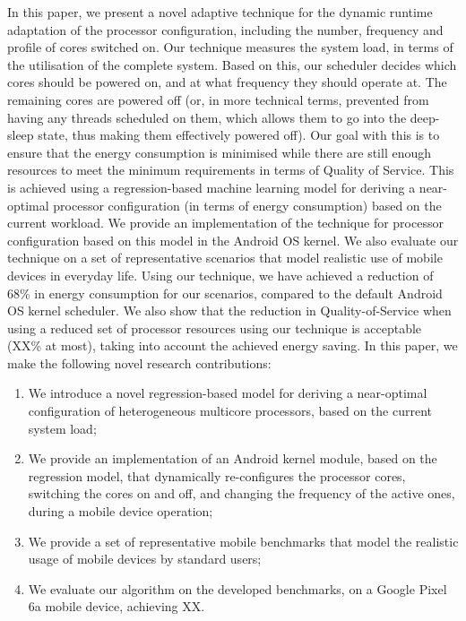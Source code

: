 \documentclass[conference]{IEEEtran}
\begin{document}
In this paper, we present a novel adaptive technique for the dynamic runtime adaptation of the processor configuration, including the number, frequency and profile of cores switched on. Our technique measures the system load, in terms of the utilisation of the complete system. Based on this, our scheduler decides which cores should be powered on, and at what frequency they should operate at. The remaining cores are powered off (or, in more technical terms, prevented from having any threads scheduled on them, which allows them to go into the deep-sleep state, thus making them effectively powered off).  Our goal with this is to ensure that the energy consumption is minimised while there are still enough resources to meet the minimum requirements in terms of Quality of Service. This is achieved using a regression-based machine learning model for deriving a near-optimal processor configuration (in terms of energy consumption) based on the current workload. We provide an implementation of the technique for processor configuration based on this model in the Android OS kernel. We also evaluate our technique on a set of representative scenarios that model realistic use of mobile devices in everyday life. Using our technique, we have achieved a reduction of 68\% in energy consumption for our scenarios, compared to the default Android OS kernel scheduler. We also show that the reduction in Quality-of-Service when using a reduced set of processor resources using our technique is acceptable (XX\% at most), taking into account the achieved energy saving. 
%
In this paper, we make the following novel research contributions:
\begin{enumerate}
\item We introduce a novel regression-based model for deriving a near-optimal configuration of heterogeneous multicore processors, based on the current system load;
\item We provide an implementation of an Android kernel module, based on the regression model, that dynamically re-configures the processor cores, switching the cores on and off, and changing the frequency of the active ones, during a mobile device operation;
\item We provide a set of representative mobile benchmarks that model the realistic usage of mobile devices by standard users;
\item We evaluate our algorithm on the developed benchmarks, on a Google Pixel 6a mobile device, achieving XX.
\end{enumerate}
\end{document}
